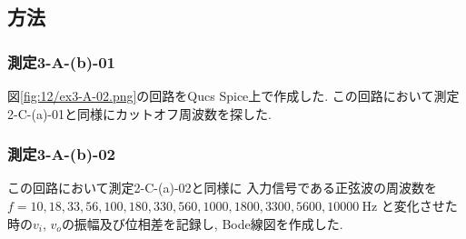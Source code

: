 \subsection{方法}
\subsubsection{測定3-A-(b)-01}
図\ref{fig:12/ex3-A-02.png}の回路をQucs Spice上で作成した.
この回路において測定2-C-(a)-01と同様にカットオフ周波数を探した.
\subsubsection{測定3-A-(b)-02}
この回路において測定2-C-(a)-02と同様に
入力信号である正弦波の周波数を$f=10,18,33,56,100,180,330,560,1000,1800,3300,5600,10000\ \si{\hertz}$
と変化させた時の$v_i$, $v_o$の振幅及び位相差を記録し, Bode線図を作成した.